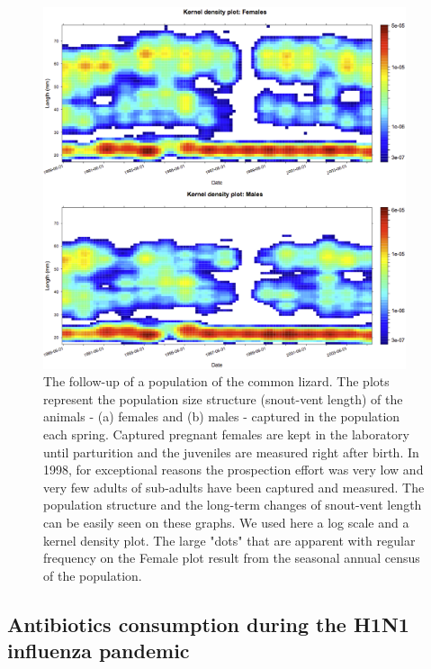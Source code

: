 \begin{figure}[!ht] %
\centering
\includegraphics[width=0.95\textwidth]{2_Methodo/Fig/04}
\caption[The follow-up of a population of the common
lizard]{The follow-up of a population of the common lizard. The plots represent
the population size structure (snout-vent length) of the animals - (a) females
and (b) males - captured in the population each spring. Captured pregnant
females are kept in the laboratory until parturition and the juveniles are
measured right after birth. In 1998, for exceptional reasons the prospection
effort was very low and very few adults of sub-adults have been captured and
measured. The population structure and the long-term changes of snout-vent
length can be easily seen on these graphs. We used here a log scale and a kernel
density plot. The large "dots" that are apparent with regular frequency on the
Female plot result from the seasonal annual census of the population.
}
\label{fig:ASTd4}
\end{figure}


\subsection{Antibiotics consumption during the H1N1 influenza pandemic}

